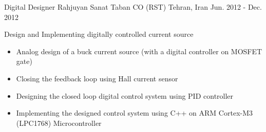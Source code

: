 \begin{cventries}
  \cventry
    {Digital Designer} %
    {Rahjuyan Sanat Taban CO (RST)} %
    {Tehran, Iran} %
    {Jun. 2012 - Dec. 2012} %
    {
      \begin{cvitems} %
        \item Design and Implementing digitally controlled current source
        \begin{itemize}
        		\item Analog design of a buck current source (with a digital controller on MOSFET gate)
        		\item Closing the feedback loop using Hall current sensor
        		\item Designing the closed loop digital control system using PID controller
        		\item Implementing the designed control system using C++ on ARM Cortex-M3 (LPC1768) Microcontroller 
        \end{itemize}
      \end{cvitems}
    }




\end{cventries}
